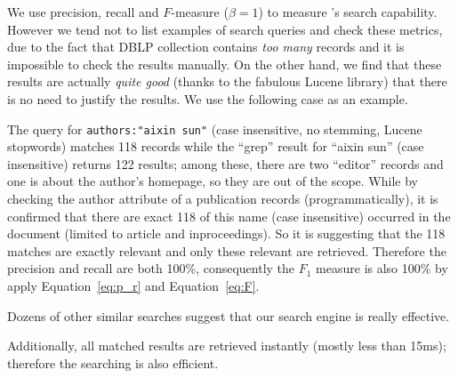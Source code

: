 We use precision, recall and $F$-measure ($\beta=1$) to measure {\SS}'s search capability. However we tend not to list examples of search queries and check these metrics, due to the fact that DBLP collection contains \emph{too many} records and it is impossible to check the results manually. On the other hand, we find that these results are actually \textit{quite good} (thanks to the fabulous Lucene library) that there is no need to justify the results. We use the following case as an example.

The query for \verb|authors:"aixin sun"| (case insensitive, no stemming, Lucene stopwords) matches 118 records while the ``grep'' result for ``aixin sun'' (case insensitive) returns 122 results; among these, there are two ``editor'' records and one is about the author's homepage, so they are out of the scope. While by checking the author attribute of a publication records (programmatically), it is confirmed that there are exact 118 of this name (case insensitive) occurred in the document (limited to \textsf{article} and \textsf{inproceedings}). So it is suggesting that the 118 matches are exactly relevant and only these relevant are retrieved. Therefore the precision and recall are both 100\%, consequently the $F_1$ measure is also 100\% by apply Equation~\ref{eq:p_r} and Equation~\ref{eq:F}.

Dozens of other similar searches suggest that our search engine is really  effective.

Additionally, all matched results are retrieved instantly (mostly less than 15ms); therefore the searching is also efficient.
